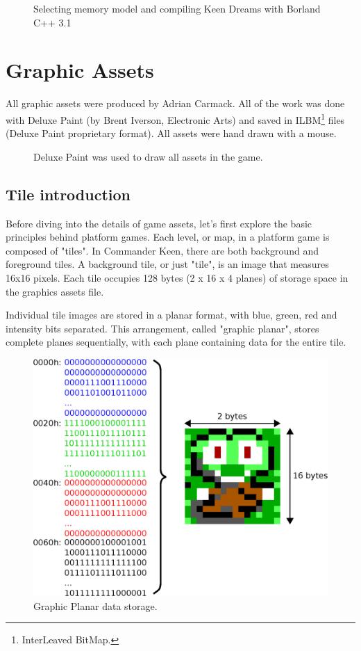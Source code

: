 \documentclass[book.tex]{subfiles}
\begin{document}
\par
\begin{figure}[H]
\centering
  \caption{Selecting memory model and compiling Keen Dreams with Borland C++ 3.1}
\end{figure}




\section{Graphic Assets}
\label{section:graphic_assets}

All graphic assets were produced by Adrian Carmack. All of the work was done with Deluxe Paint (by Brent Iverson, Electronic Arts) and saved in ILBM\footnote{InterLeaved BitMap.} files (Deluxe Paint proprietary format). All assets were hand drawn with a mouse.

\begin{figure}[H]
  \centering
 \caption{Deluxe Paint was used to draw all assets in the game.}
\end{figure}

\subsection{Tile introduction}
Before diving into the details of game assets, let's first explore the basic principles behind platform games. Each level, or map, in a platform game is composed of "tiles". In Commander Keen, there are both background and foreground tiles. A background tile, or just "tile", is an image that measures 16x16 pixels. Each tile occupies 128 bytes (2 x 16 x 4 planes) of storage space in the graphics assets file.\\

\par
Individual tile images are stored in a planar format, with blue, green, red and intensity bits separated. This arrangement, called "graphic planar", stores complete planes sequentially, with each plane containing data for the entire tile.\\

\par
\begin{figure}[H]
\centering
 \includegraphics[width=.8\textwidth]{imgs/drawings/Tile_RGBI.eps}
 \caption{Graphic Planar data storage.}
 \label{graphic_planar}
\end{figure}
\end{document}
